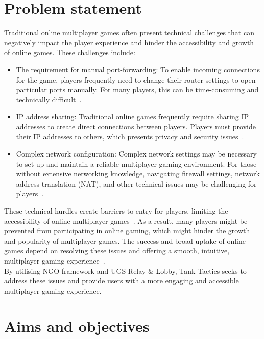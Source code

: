 \section{Problem statement}
\label{sec:intro_prob_art}
Traditional online multiplayer games often present technical challenges that can negatively impact the player experience and hinder the accessibility and growth of online games. These challenges include:
\begin{itemize}
    \item The requirement for manual port-forwarding: To enable incoming connections for the game, players frequently need to change their router settings to open particular ports manually. For many players, this can be time-consuming and technically difficult~\cite{network-architecting}.
    \item IP address sharing: Traditional online games frequently require sharing IP addresses to create direct connections between players. Players must provide their IP addresses to others, which presents privacy and security issues~\cite{issues-socialComputing}.
    \item Complex network configuration: Complex network settings may be necessary to set up and maintain a reliable multiplayer gaming environment. For those without extensive networking knowledge, navigating firewall settings, network address translation (NAT), and other technical issues may be challenging for players~\cite{develop-unity}.
\end{itemize}
These technical hurdles create barriers to entry for players, limiting the accessibility of online multiplayer games~\cite{port-forwarding}. As a result, many players might be prevented from participating in online gaming, which might hinder the growth and popularity of multiplayer games. The success and broad uptake of online games depend on resolving these issues and offering a smooth, intuitive, multiplayer gaming experience~\cite{multiplayer-networking}.
\\
By utilising NGO framework and UGS Relay \& Lobby, Tank Tactics seeks to address these issues and provide users with a more engaging and accessible multiplayer gaming experience. 

\section{Aims and objectives}
\label{sec:intro_aims_obj}

